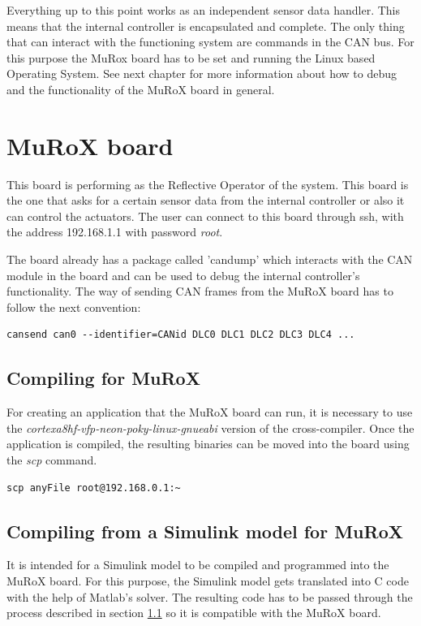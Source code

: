\documentclass[12pt]{report}%
\begin{document}
Everything up to this point works as an independent sensor data handler. This means that the internal controller is encapsulated and complete. The only thing that can interact with the functioning system are commands in the CAN bus. For this purpose the MuRox board has to be set and running the Linux based Operating System. See next chapter for more information about how to debug and the functionality of the MuRoX board in general.

\chapter{MuRoX board}
\label{chap:reflective}
This board is performing as the Reflective Operator of the system. This board is the one that asks for a certain sensor data from the internal controller or also it can control the actuators. The user can connect to this board through ssh, with the address 192.168.1.1 with password \textit{root}.

The board already has a package called 'candump' which interacts with the CAN module in the board and can be used to debug the internal controller's functionality. The way of sending CAN frames from the MuRoX board has to follow the next convention:

\begin{lstlisting}[caption = CAN send format, label = CAN:debug, captionpos = b]
cansend can0 --identifier=CANid DLC0 DLC1 DLC2 DLC3 DLC4 ...
\end{lstlisting}

\section{Compiling for MuRoX}
\label{sec:poky}
For creating an application that the MuRoX board can run, it is necessary to use the \textit{cortexa8hf-vfp-neon-poky-linux-gnueabi} version of the cross-compiler. Once the application is compiled, the resulting binaries can be moved into the board using the \textit{scp} command.

\begin{lstlisting}[caption = moving files into MuRoX board \cite{AMiRo_Murox}, label = CAN:debug, captionpos = b]
scp anyFile root@192.168.0.1:~
\end{lstlisting}

\section{Compiling from a Simulink model for MuRoX}
It is intended for a Simulink model to be compiled and programmed into the MuRoX board. For this purpose, the Simulink model gets translated into C code with the help of Matlab's solver. The resulting code has to be passed through the process described in section \ref{sec:poky} so it is compatible with the MuRoX board.
\end{document}
